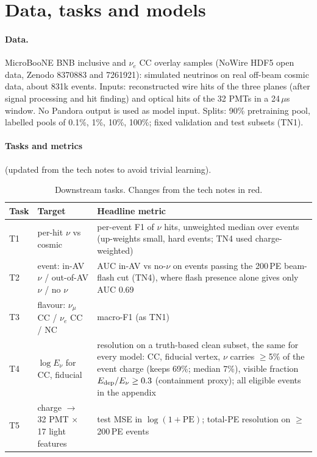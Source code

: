 \documentclass[11pt,a4paper]{article}
\newcommand{\nue}{\ensuremath{\nu_e}}
\newcommand{\numu}{\ensuremath{\nu_\mu}}
\begin{document}
\section{Data, tasks and models}\label{sec:setup}
\paragraph{Data.} MicroBooNE BNB inclusive and \nue{} CC overlay samples (NoWire HDF5 open data, Zenodo 8370883 and 7261921): simulated neutrinos on real off-beam cosmic data, about 831k events. Inputs: reconstructed wire hits of the three planes (after signal processing and hit finding) and optical hits of the 32 PMTs in a 24\,$\mu$s window. No Pandora output is used as model input. Splits: 90\% pretraining pool, labelled pools of 0.1\%, 1\%, 10\%, 100\%; fixed validation and test subsets (TN1).

\paragraph{Tasks and metrics} {\color{plan}(updated from the tech notes to avoid trivial learning)}.
\begin{table}[H]\centering\footnotesize
\caption{Downstream tasks. {\color{plan}Changes from the tech notes in red.}}\label{tab:tasks}
\begin{tabularx}{\textwidth}{lLL}\toprule
Task & Target & Headline metric\\\midrule
T1 & per-hit $\nu$ vs cosmic & {\color{plan}per-event F1 of $\nu$ hits, unweighted median over events} (up-weights small, hard events; TN4 used charge-weighted)\\
T2 & event: in-AV $\nu$ / out-of-AV $\nu$ / no $\nu$ & {\color{plan}AUC in-AV vs no-$\nu$ on events passing the 200\,PE beam-flash cut} (TN4), where flash presence alone gives only AUC 0.69\\
T3 & flavour: \numu{} CC / \nue{} CC / NC & macro-F1 (as TN1)\\
T4 & $\log E_\nu$ for CC, fiducial & {\color{plan}resolution on a truth-based clean subset, the same for every model}: CC, fiducial vertex, $\nu$ carries $\geq$5\% of the event charge (keeps 69\%; median 7\%), visible fraction $E_{\rm dep}/E_\nu\geq0.3$ (containment proxy); all eligible events in the appendix\\
T5 & charge $\to$ 32 PMT $\times$ 17 light features & test MSE in $\log(1+\mathrm{PE})$; total-PE resolution on $\geq$200\,PE events\\
\bottomrule\end{tabularx}
\end{table}
\end{document}
